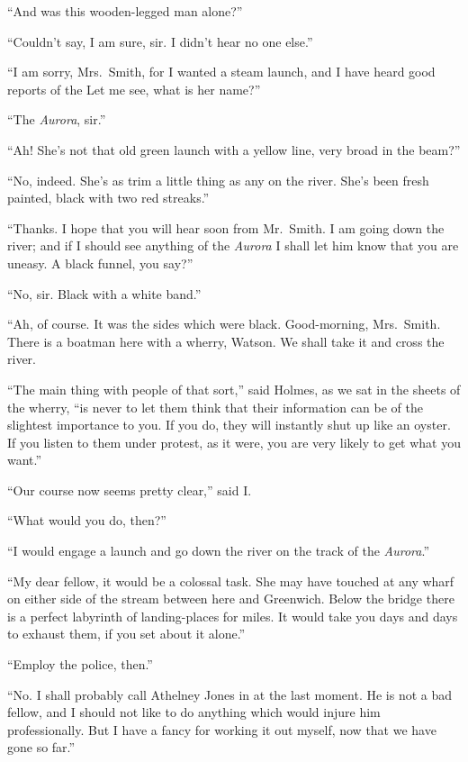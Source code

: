 \documentclass[12pt,english,oneside]{book}
\begin{document}
{}``And was this wooden-legged man alone?''

{}``Couldn't say, I am sure, sir. I didn't hear no one else.''

{}``I am sorry, Mrs.\ Smith, for I wanted a steam launch, and I
have heard good reports of the\mdsh{---} Let me see, what is her
name?''

{}``The \emph{Aurora}, sir.''

{}``Ah! She's not that old green launch with a yellow line, very
broad in the beam?''

{}``No, indeed. She's as trim a little thing as any on the river.
She's been fresh painted, black with two red streaks.''

{}``Thanks. I hope that you will hear soon from Mr.\ Smith. I am
going down the river; and if I should see anything of the \emph{Aurora}
I shall let him know that you are uneasy. A black funnel, you say?''

{}``No, sir. Black with a white band.''

{}``Ah, of course. It was the sides which were black. Good-morning,
Mrs.\ Smith.\mdsh{---} There is a boatman here with a wherry, Watson.
We shall take it and cross the river.

{}``The main thing with people of that sort,'' said Holmes, as we
sat in the sheets of the wherry, {}``is never to let them think that
their information can be of the slightest importance to you. If you
do, they will instantly shut up like an oyster. If you listen to them
under protest, as it were, you are very likely to get what you want.''

{}``Our course now seems pretty clear,'' said I.

{}``What would you do, then?''

{}``I would engage a launch and go down the river on the track of
the \emph{Aurora}.''

{}``My dear fellow, it would be a colossal task. She may have touched
at any wharf on either side of the stream between here and Greenwich.
Below the bridge there is a perfect labyrinth of landing-places for
miles. It would take you days and days to exhaust them, if you set
about it alone.''

{}``Employ the police, then.''

{}``No. I shall probably call Athelney Jones in at the last moment.
He is not a bad fellow, and I should not like to do anything which
would injure him professionally. But I have a fancy for working it
out myself, now that we have gone so far.''
\end{document}
